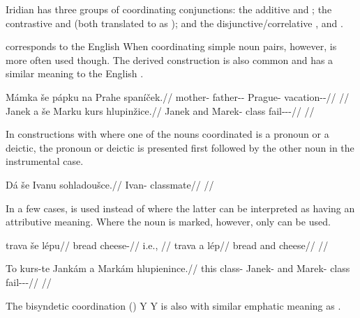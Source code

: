Iridian has three groups of coordinating conjunctions: the additive
 and ; the contrastive  and  (both
translated to  as ); and the
disjunctive/correlative ,  and .

 corresponds to the English  When coordinating simple noun
pairs, however,  is more often used though. The derived construction
 is also common and has a similar meaning to the English .

\pex
\begingl
    \gla Mámka {še} pápku na Prahe spaníček.//
    \glb mother-\Dim{} \Com{} father-\Dim{}-\Ins{} \Loc{} Prague-\Acc{} vacation-\Av{}-\Pf{}//
    \glft {}//
\endgl
\xe
\pex
\begingl
    \gla Janek {a} {še} Marku kurs hlupinžice.//
    \glb Janek and \Com{} Marek-\Ins{} class fail-\Av{}-\Pf{}-\Quot{}//
    \glft {}//
\endgl
\xe

In constructions with  where one of the nouns coordinated is a pronoun
or a deictic, the pronoun or deictic is presented first followed
by the other noun in the instrumental case.

\pex
\begingl
    \gla Dá {še} Ivanu sohladoušce.// \glb \First{}\Sg{} \Com{} Ivan-\Ins{}
    classmate// \glft {}//
\endgl
\xe

In a few cases,  is used instead of  where the latter can be
interpreted as having an attributive meaning. Where the noun is marked, however,
only  can be used.

\begin{multicols}{2}
\pex\a
\begingl
    \gla trava {še} lépu//
    \glb bread \Com{} cheese-\Ins{}//
    \glft {} i.e., //
\endgl
\a
\begingl
    \gla trava {a} lép//
    \glb bread and cheese//
    \glft {}//
\endgl
\xe\end{multicols}

\pex
\begingl
    \gla To kurs-te Jankám {a} Markám hlupienince.//
    \glb this class-\Foc{} Janek-\Agt{} and Marek-\Agt{} class fail-\Pv{}-\Pf{}-\Quot{}//
    \glft {}//
\endgl
\xe


The bisyndetic coordination (\cite{velupillai2012})  Y  Y is also
with similar emphatic meaning as .

